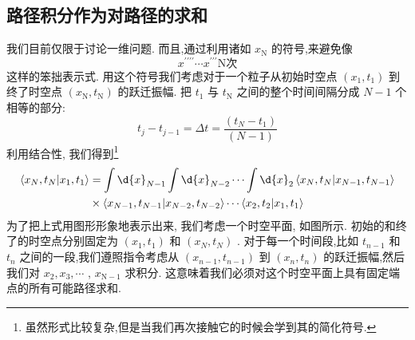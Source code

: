 \subsection{路径积分作为对路径的求和}
我们目前仅限于讨论一维问题. 而且,通过利用诸如 ${x}_{\mathrm{N}}$ 的符号,来避免像
\begin{equation}
{x}^{\prime \prime \prime \prime }\cdots {x}^{\prime \prime \prime }\text{N次}
\end{equation}
这样的笨拙表示式. 用这个符号我们考虑对于一个粒子从初始时空点 $\left( {{x}_{1},{t}_{1}}\right)$ 到终了时空点 $\left( {{x}_{\mathrm{N}},{t}_{\mathrm{N}}}\right)$ 的跃迁振幅. 把 ${t}_{1}$ 与 ${t}_{\mathrm{N}}$ 之间的整个时间间隔分成 $N - 1$ 个相等的部分:
\begin{equation}
{t}_{j} - {t}_{j - 1} = {\Delta t} = \frac{\left( {t}_{N} - {t}_{1}\right) }{\left( N - 1\right) }
\end{equation}
利用结合性, 我们得到\footnote{虽然形式比较复杂,但是当我们再次接触它的时候会学到其的简化符号.}
\begin{equation}
\begin{aligned}
	\left\langle {{x}_{N},{t}_{N} | {x}_{1},{t}_{1}}\right\rangle &= \int \d{x}_{N - 1}\int \d{x}_{N - 2}\cdots \int \d{x}_{2}\left\langle {{x}_{N},{t}_{N} | {x}_{N - 1},{t}_{N - 1}}\right\rangle\\
	&\times \left\langle {{x}_{N - 1},{t}_{N - 1} | {x}_{N - 2},{t}_{N - 2}}\right\rangle \cdots \left\langle {{x}_{2},{t}_{2} | {x}_{1},{t}_{1}}\right\rangle
\end{aligned}
\end{equation}
为了把上式用图形形象地表示出来, 我们考虑一个时空平面, 如图所示. 初始的和终了的时空点分别固定为 $\left( {{x}_{1},{t}_{1}}\right)$ 和 $\left( {{x}_{N},{t}_{N}}\right)$ . 对于每一个时间段,比如 ${t}_{n - 1}$ 和 ${t}_{n}$ 之间的一段,我们遵照指令考虑从 $\left( {{x}_{n - 1},{t}_{n - 1}}\right)$ 到 $\left( {{x}_{n},{t}_{n}}\right)$ 的跃迁振幅,然后我们对 ${x}_{2},{x}_{3},\cdots$ , ${x}_{\mathrm{N} - 1}$ 求积分. 这意味着我们必须对这个时空平面上具有固定端点的所有可能路径求和.
